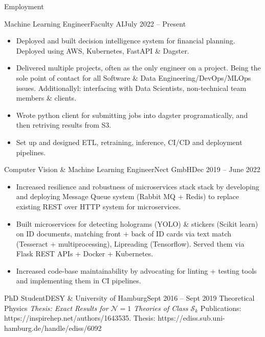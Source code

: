 \documentclass[]{mcdowellcv}
\begin{document}
	\makeheader
	
	\begin{cvsection}{Employment}
		\begin{cvsubsection}{Machine Learning Engineer}{Faculty AI}{July 2022 -- Present}			
			\begin{itemize}
                \item Deployed and built decision intelligence system for financial planning. Deployed using AWS, Kubernetes, FastAPI \& Dagster.
                \item Delivered multiple projects, often as the only engineer on a project. Being the sole point of contact for all Software \& Data Engineering/DevOps/MLOps issues. Additionallyl: interfacing with Data Scientists, non-technical team members \& clients.
				\item Wrote python client for submitting jobs into dagster programatically, and then retriving results from S3.
                \item Set up and designed  ETL, retraining, inference, CI/CD and deployment pipelines.
			\end{itemize}
		\end{cvsubsection}
		
		\begin{cvsubsection}[2]{Computer Vision \& Machine Learning Engineer}{Nect GmbH}{Dec 2019 -- June 2022}	
			\begin{itemize}
				\item Increased resilience and robustness of microservices stack stack by developing and deploying Message Queue system (Rabbit MQ + Redis) to replace existing REST over HTTP system for microservices.
                \item Built microservices for detecting holograms (YOLO) \& stickers (Scikit learn) on ID documents, matching front + back of ID cards via text match (Tesseract + multiprocessing), Lipreading (Tensorflow). Served them via Flask REST APIs + Docker + Kubernetes.
				\item Increased code-base maintainability by advocating for linting + testing tools and implementing them in CI pipelines.
			\end{itemize}
		\end{cvsubsection}
		
		\begin{cvsubsection}{PhD Student}{DESY \& University of Hamburg}{Sept 2016 -- Sept 2019}
            Theoretical Physics \hfill \textit{Thesis: Exact Results for $\mathcal{N}=1$ Theories of Class $\mathcal{S}_k$}\newline
                Publications: https://inspirehep.net/authors/1643535.\newline
                Thesis: https://ediss.sub.uni-hamburg.de/handle/ediss/6092
		\end{cvsubsection}
		

\end{cvsection}
\end{document}
